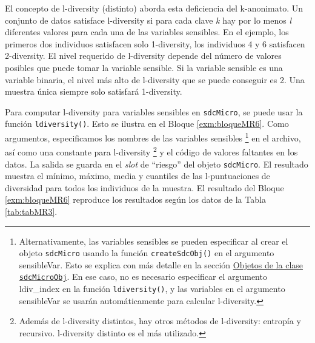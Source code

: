 \documentclass[
]{book}
\theoremstyle{definition}
\theoremstyle{definition}
\theoremstyle{definition}
\theoremstyle{definition}
\theoremstyle{remark}
\begin{document}
El concepto de l-diversity (distinto) aborda esta deficiencia del k-anonimato. Un conjunto de datos satisface l-diversity si para cada clave \emph{k} hay por lo menos \emph{l} diferentes valores para cada una de las variables sensibles. En el ejemplo, los primeros dos individuos satisfacen solo 1-diversity, los individuos 4 y 6 satisfacen 2-diversity. El nivel requerido de l-diversity depende del número de valores posibles que puede tomar la variable sensible. Si la variable sensible es una variable binaria, el nivel más alto de l-diversity que se puede conseguir es 2. Una muestra única siempre solo satisfará 1-diversity.

Para computar l-diversity para variables sensibles en \texttt{sdcMicro}, se puede usar la función \texttt{ldiversity()}. Esto se ilustra en el Bloque \ref{exm:bloqueMR6}. Como argumentos, especificamos los nombres de las variables sensibles \footnote{Alternativamente, las variables sensibles se pueden especificar al crear el objeto \texttt{sdcMicro} usando la función \texttt{createSdcObj()} en el argumento sensibleVar. Esto se explica con más detalle en la sección \protect\hyperlink{objetos-de-la-clase-sdcmicroobj}{Objetos de la clase \texttt{sdcMicroObj}}. En ese caso, no es necesario especificar el argumento ldiv\_index en la función \texttt{ldiversity()}, y las variables en el argumento sensibleVar se usarán automáticamente para calcular l-diversity.} en el archivo, así como una constante para l-diversity \footnote{Además de l-diversity distintos, hay otros métodos de l-diversity: entropía y recursivo. l-diversity distinto es el más utilizado.} y el código de valores faltantes en los datos. La salida se guarda en el \emph{slot} de ``riesgo'' del objeto \texttt{sdcMicro}. El resultado muestra el mínimo, máximo, media y cuantiles de las l-puntuaciones de diversidad para todos los individuos de la muestra. El resultado del Bloque \ref{exm:bloqueMR6} reproduce los resultados según los datos de la Tabla \ref{tab:tabMR3}.
\end{document}
